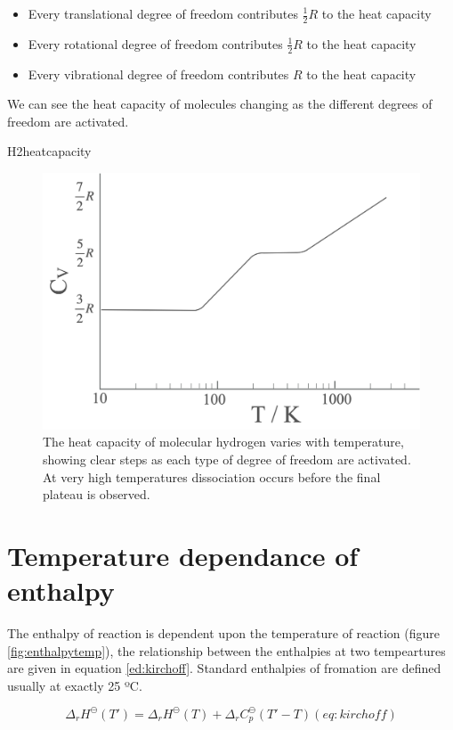 \documentclass[
]{book}
\begin{document}
\begin{itemize}
\item
  Every translational degree of freedom contributes \(\frac{1}{2}R\) to the heat capacity
\item
  Every rotational degree of freedom contributes \(\frac{1}{2}R\) to the heat capacity
\item
  Every vibrational degree of freedom contributes \(R\) to the heat capacity
\end{itemize}

We can see the heat capacity of molecules changing as the different degrees of freedom are activated.

H2heatcapacity

\begin{figure}

{\centering \includegraphics[width=0.3\linewidth]{images/H2heatcapacity} 

}

\caption{The heat capacity of molecular hydrogen varies with temperature, showing clear steps as each type of degree of freedom are activated. At very high temperatures dissociation occurs before the final plateau is observed.}\label{fig:H2heatcapacity}
\end{figure}

\hypertarget{temperature-dependance-of-enthalpy}{%
\section{Temperature dependance of enthalpy}\label{temperature-dependance-of-enthalpy}}

The enthalpy of reaction is dependent upon the temperature of reaction (figure \ref{fig:enthalpytemp}), the relationship between the enthalpies at two tempeartures are given in equation \ref{ed:kirchoff}. Standard enthalpies of fromation are defined usually at exactly 25 ºC.

\begin{equation}
\Delta_r H^{\ominus} (T')=\Delta_r H^{\ominus} (T) + \Delta_r C_p^{\ominus} (T'-T)
(eq:kirchoff)
\end{equation}
\end{document}
